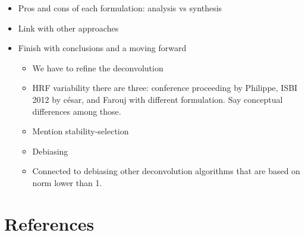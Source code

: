 \documentclass[5p]{elsarticle}
\begin{document}
\begin{itemize}
    \item Pros and cons of each formulation: analysis vs synthesis
    \item Link with other approaches
    \item Finish with conclusions and a moving forward
    \begin{itemize}
        \item We have to refine the deconvolution
        \item HRF variability there are three: conference proceeding by Philippe, ISBI 2012 by césar, and Farouj with different formulation. Say conceptual differences among those.
        \item Mention stability-selection
        \item Debiasing
        \item Connected to debiasing other deconvolution algorithms that are based on norm lower than 1.
    \end{itemize}
\end{itemize}

\section*{References}


\end{document}
